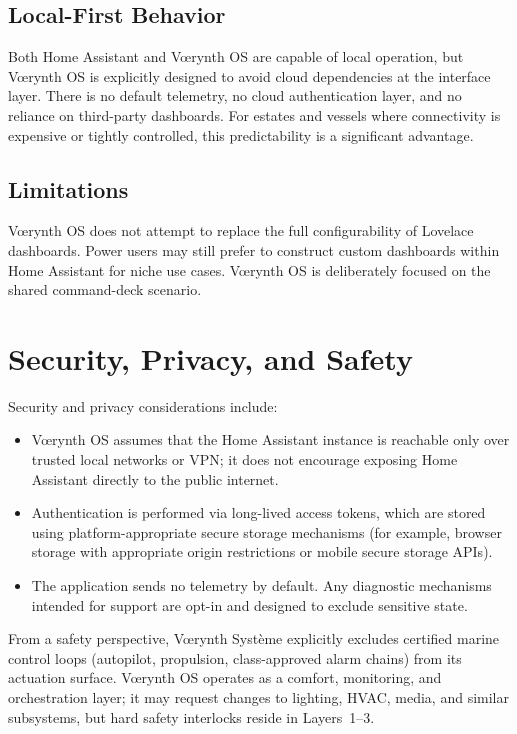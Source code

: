 \documentclass[11pt,a4paper]{article}
\begin{document}
\subsection{Local-First Behavior}

Both Home Assistant and Vœrynth OS are capable of local operation, but Vœrynth OS is explicitly designed to avoid cloud dependencies at the interface layer. There is no default telemetry, no cloud authentication layer, and no reliance on third-party dashboards. For estates and vessels where connectivity is expensive or tightly controlled, this predictability is a significant advantage.

\subsection{Limitations}

Vœrynth OS does not attempt to replace the full configurability of Lovelace dashboards. Power users may still prefer to construct custom dashboards within Home Assistant for niche use cases. Vœrynth OS is deliberately focused on the shared command-deck scenario.

\section{Security, Privacy, and Safety}

Security and privacy considerations include:
\begin{itemize}[leftmargin=*]
  \item Vœrynth OS assumes that the Home Assistant instance is reachable only over trusted local networks or VPN; it does not encourage exposing Home Assistant directly to the public internet.
  \item Authentication is performed via long-lived access tokens, which are stored using platform-appropriate secure storage mechanisms (for example, browser storage with appropriate origin restrictions or mobile secure storage APIs).
  \item The application sends no telemetry by default. Any diagnostic mechanisms intended for support are opt-in and designed to exclude sensitive state.
\end{itemize}

From a safety perspective, Vœrynth Système explicitly excludes certified marine control loops (autopilot, propulsion, class-approved alarm chains) from its actuation surface. Vœrynth OS operates as a comfort, monitoring, and orchestration layer; it may request changes to lighting, HVAC, media, and similar subsystems, but hard safety interlocks reside in Layers~1--3.
\end{document}
